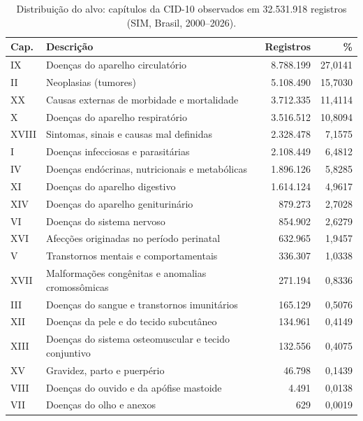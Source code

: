 \documentclass[12pt]{article}
\begin{document}
\begin{table}[ht]
\centering
\caption{Distribuição do alvo: capítulos da CID-10 observados em 32.531.918
  registros (SIM, Brasil, 2000--2026).}
\label{tab:classes}
\begin{tabular}{|l|l|r|r|}
\hline
\textbf{Cap.} & \textbf{Descrição} & \textbf{Registros} & \textbf{\%} \\
\hline
IX    & Doenças do aparelho circulatório                       & 8.788.199 & 27,0141 \\
II    & Neoplasias (tumores)                                   & 5.108.490 & 15,7030 \\
XX    & Causas externas de morbidade e mortalidade             & 3.712.335 & 11,4114 \\
X     & Doenças do aparelho respiratório                       & 3.516.512 & 10,8094 \\
XVIII & Sintomas, sinais e causas mal definidas                & 2.328.478 &  7,1575 \\
I     & Doenças infecciosas e parasitárias                     & 2.108.449 &  6,4812 \\
IV    & Doenças endócrinas, nutricionais e metabólicas         & 1.896.126 &  5,8285 \\
XI    & Doenças do aparelho digestivo                          & 1.614.124 &  4,9617 \\
XIV   & Doenças do aparelho geniturinário                      &   879.273 &  2,7028 \\
VI    & Doenças do sistema nervoso                             &   854.902 &  2,6279 \\
XVI   & Afecções originadas no período perinatal               &   632.965 &  1,9457 \\
V     & Transtornos mentais e comportamentais                  &   336.307 &  1,0338 \\
XVII  & Malformações congênitas e anomalias cromossômicas      &   271.194 &  0,8336 \\
III   & Doenças do sangue e transtornos imunitários            &   165.129 &  0,5076 \\
XII   & Doenças da pele e do tecido subcutâneo                 &   134.961 &  0,4149 \\
XIII  & Doenças do sistema osteomuscular e tecido conjuntivo   &   132.556 &  0,4075 \\
XV    & Gravidez, parto e puerpério                            &    46.798 &  0,1439 \\
VIII  & Doenças do ouvido e da apófise mastoide                &     4.491 &  0,0138 \\
VII   & Doenças do olho e anexos                               &       629 &  0,0019 \\
\hline
\end{tabular}
\end{table}
\end{document}
